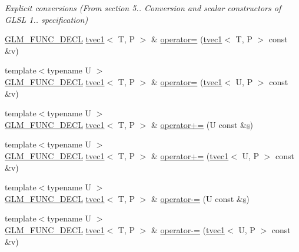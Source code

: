 \begin{DoxyCompactItemize}
\begin{DoxyCompactList}\small\item\em Explicit conversions (From section 5.. Conversion and scalar constructors of G\+L\+SL 1.. specification) \end{DoxyCompactList}\item 
\hyperlink{setup_8hpp_ab2d052de21a70539923e9bcbf6e83a51}{G\+L\+M\+\_\+\+F\+U\+N\+C\+\_\+\+D\+E\+CL} \hyperlink{structglm_1_1detail_1_1tvec1}{tvec1}$<$ T, P $>$ \& \hyperlink{structglm_1_1detail_1_1tvec1_a1e15e21ac8d2986fde39e7553fc41d8a}{operator=} (\hyperlink{structglm_1_1detail_1_1tvec1}{tvec1}$<$ T, P $>$ const \&v)
\item 
{\footnotesize template$<$typename U $>$ }\\\hyperlink{setup_8hpp_ab2d052de21a70539923e9bcbf6e83a51}{G\+L\+M\+\_\+\+F\+U\+N\+C\+\_\+\+D\+E\+CL} \hyperlink{structglm_1_1detail_1_1tvec1}{tvec1}$<$ T, P $>$ \& \hyperlink{structglm_1_1detail_1_1tvec1_ae2928514df11c9bd6a89ed04ee2c57f7}{operator=} (\hyperlink{structglm_1_1detail_1_1tvec1}{tvec1}$<$ U, P $>$ const \&v)
\item 
{\footnotesize template$<$typename U $>$ }\\\hyperlink{setup_8hpp_ab2d052de21a70539923e9bcbf6e83a51}{G\+L\+M\+\_\+\+F\+U\+N\+C\+\_\+\+D\+E\+CL} \hyperlink{structglm_1_1detail_1_1tvec1}{tvec1}$<$ T, P $>$ \& \hyperlink{structglm_1_1detail_1_1tvec1_a6ae40e6821e60a9018d1eb8a1cca3da9}{operator+=} (U const \&\hyperlink{structglm_1_1detail_1_1tvec1_a1025b03a3e1f99c7a42518af40737d7b}{s})
\item 
{\footnotesize template$<$typename U $>$ }\\\hyperlink{setup_8hpp_ab2d052de21a70539923e9bcbf6e83a51}{G\+L\+M\+\_\+\+F\+U\+N\+C\+\_\+\+D\+E\+CL} \hyperlink{structglm_1_1detail_1_1tvec1}{tvec1}$<$ T, P $>$ \& \hyperlink{structglm_1_1detail_1_1tvec1_af5d7976948734a9a514d87d8508ea2ac}{operator+=} (\hyperlink{structglm_1_1detail_1_1tvec1}{tvec1}$<$ U, P $>$ const \&v)
\item 
{\footnotesize template$<$typename U $>$ }\\\hyperlink{setup_8hpp_ab2d052de21a70539923e9bcbf6e83a51}{G\+L\+M\+\_\+\+F\+U\+N\+C\+\_\+\+D\+E\+CL} \hyperlink{structglm_1_1detail_1_1tvec1}{tvec1}$<$ T, P $>$ \& \hyperlink{structglm_1_1detail_1_1tvec1_affba0ab0b93fbaa98d843c89433606f3}{operator-\/=} (U const \&\hyperlink{structglm_1_1detail_1_1tvec1_a1025b03a3e1f99c7a42518af40737d7b}{s})
\item 
{\footnotesize template$<$typename U $>$ }\\\hyperlink{setup_8hpp_ab2d052de21a70539923e9bcbf6e83a51}{G\+L\+M\+\_\+\+F\+U\+N\+C\+\_\+\+D\+E\+CL} \hyperlink{structglm_1_1detail_1_1tvec1}{tvec1}$<$ T, P $>$ \& \hyperlink{structglm_1_1detail_1_1tvec1_af8992bb613669f1a7aa0ff41a4fd31e3}{operator-\/=} (\hyperlink{structglm_1_1detail_1_1tvec1}{tvec1}$<$ U, P $>$ const \&v)

\end{DoxyCompactItemize}
